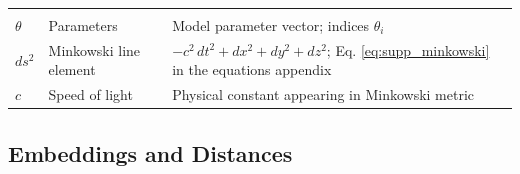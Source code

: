 \documentclass[
  10pt,
]{article}
\begin{document}
\begin{longtable}[]{@{}lll@{}}
\begin{minipage}[t]{0.30\columnwidth}
\end{minipage}\tabularnewline
\begin{minipage}[t]{0.30\columnwidth}\raggedright
\(\theta\)\strut
\end{minipage} & \begin{minipage}[t]{0.30\columnwidth}\raggedright
Parameters\strut
\end{minipage} & \begin{minipage}[t]{0.30\columnwidth}\raggedright
Model parameter vector; indices \(\theta_i\)\strut
\end{minipage}\tabularnewline
\begin{minipage}[t]{0.30\columnwidth}\raggedright
\(ds^2\)\strut
\end{minipage} & \begin{minipage}[t]{0.30\columnwidth}\raggedright
Minkowski line element\strut
\end{minipage} & \begin{minipage}[t]{0.30\columnwidth}\raggedright
\(-c^2\,dt^2 + dx^2 + dy^2 + dz^2\); Eq. \eqref{eq:supp_minkowski} in
the equations appendix\strut
\end{minipage}\tabularnewline
\begin{minipage}[t]{0.30\columnwidth}\raggedright
\(c\)\strut
\end{minipage} & \begin{minipage}[t]{0.30\columnwidth}\raggedright
Speed of light\strut
\end{minipage} & \begin{minipage}[t]{0.30\columnwidth}\raggedright
Physical constant appearing in Minkowski metric\strut
\end{minipage}\tabularnewline
\bottomrule
\end{longtable}

\hypertarget{embeddings-and-distances}{%
\subsection{Embeddings and Distances}\label{embeddings-and-distances}}
\end{document}
